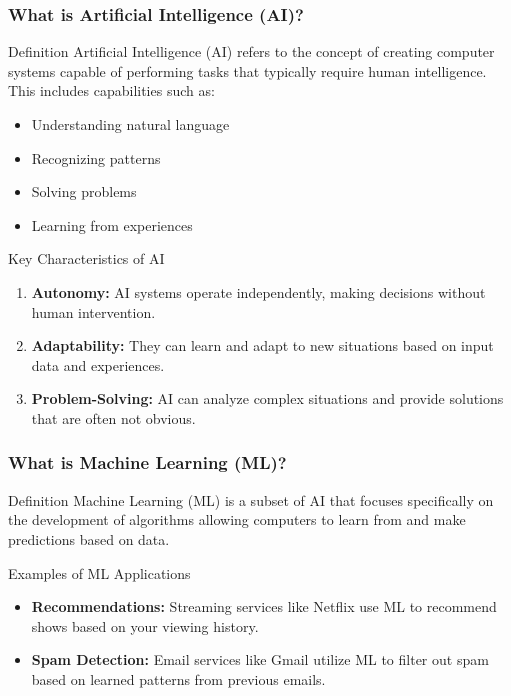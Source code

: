 \documentclass[aspectratio=169]{beamer}
\begin{document}
\begin{frame}[fragile]
    \frametitle{What is Artificial Intelligence (AI)?}
    \begin{block}{Definition}
        Artificial Intelligence (AI) refers to the concept of creating computer systems capable of performing tasks that typically require human intelligence. This includes capabilities such as:
        \begin{itemize}
            \item Understanding natural language
            \item Recognizing patterns
            \item Solving problems
            \item Learning from experiences
        \end{itemize}
    \end{block}
    
    \begin{block}{Key Characteristics of AI}
        \begin{enumerate}
            \item \textbf{Autonomy:} AI systems operate independently, making decisions without human intervention.
            \item \textbf{Adaptability:} They can learn and adapt to new situations based on input data and experiences.
            \item \textbf{Problem-Solving:} AI can analyze complex situations and provide solutions that are often not obvious.
        \end{enumerate}
    \end{block}
\end{frame}

\begin{frame}[fragile]
    \frametitle{What is Machine Learning (ML)?}
    \begin{block}{Definition}
        Machine Learning (ML) is a subset of AI that focuses specifically on the development of algorithms allowing computers to learn from and make predictions based on data.
    \end{block}
    
    \begin{block}{Examples of ML Applications}
        \begin{itemize}
            \item \textbf{Recommendations:} Streaming services like Netflix use ML to recommend shows based on your viewing history.
            \item \textbf{Spam Detection:} Email services like Gmail utilize ML to filter out spam based on learned patterns from previous emails.
        \end{itemize}
    \end{block}
\end{frame}
\end{document}

